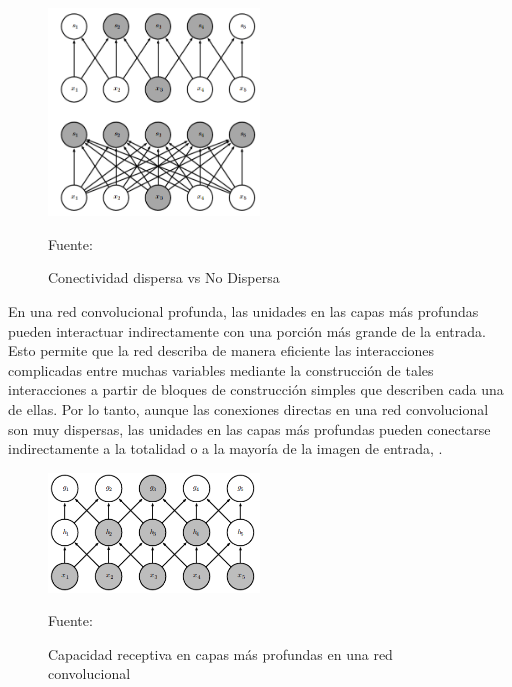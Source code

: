 		\begin{figure}[H]
		\begin{center}
		\includegraphics[width=0.5\textwidth]{images/marcoteorico/sparceCon}
		\end{center}
		\begin{center}
		\caption{\footnotesize \small{Conectividad dispersa vs No Dispersa}}
		\vskip -0.3cm  
		{\small{Fuente:\cite{Goodfellow-et-al-2016}}}
		\end{center}
		\vspace{-1.9em}
		\end{figure} 	

		  
		En una red convolucional profunda, las unidades en las capas más profundas pueden interactuar indirectamente con una porción más grande de la entrada. Esto permite que la red describa de manera eficiente las interacciones complicadas entre muchas variables mediante la construcción de tales interacciones a partir de bloques de construcción simples que describen cada una de ellas. Por lo tanto, aunque las conexiones directas en una red convolucional son muy dispersas, las unidades en las capas más profundas pueden conectarse indirectamente a la totalidad o a la mayoría de la imagen de entrada, \citep{Goodfellow-et-al-2016}.
		\begin{figure}[H]
		\begin{center}
		\includegraphics[width=0.5\textwidth]{images/marcoteorico/sparceCondeep}
		\end{center}
		\begin{center}
		\caption{\footnotesize \small{Capacidad receptiva en capas más profundas en una red convolucional}}
		\vskip -0.3cm  
		{\small{Fuente:\cite{Goodfellow-et-al-2016}}}
		\end{center}
		\vspace{-1.9em}
		\end{figure} 	

